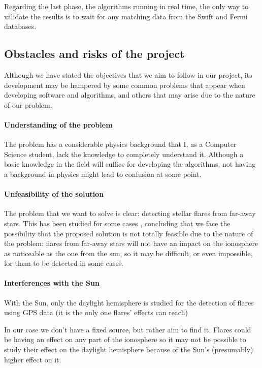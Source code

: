 Regarding the last phase, the algorithms running in real time, the only way to validate the results is to wait for any matching data from the Swift and Fermi databases.

\subsection{Obstacles and risks of the project}

Although we have stated the objectives that we aim to follow in our project, its development may be hampered by some common problems that appear when developing software and algorithms, and others that may arise due to the nature of our problem.

\paragraph{Understanding of the problem}

The problem has a considerable physics background that I, as a Computer Science student, lack the knowledge to completely understand it. Although a basic knowledge in the field will suffice for developing the algorithms, not having a background in physics might lead to confusion at some point.

\paragraph{Unfeasibility of the solution}

The problem that we want to solve is clear: detecting stellar flares from far-away stars. This has been studied for some cases \cite{martinez2016first}, concluding that we face the possibility that the proposed solution is not totally feasible due to the nature of the problem: flares from far-away stars will not have an impact on the ionosphere as noticeable as the one from the sun, so it may be difficult, or even impossible, for them to be detected in some cases.

\paragraph{Interferences with the Sun}

With the Sun, only the daylight hemisphere is studied for the detection of flares using GPS data (it is the only one flares' effects can reach)

In our case we don’t have a fixed source, but rather aim to find it. Flares could be having an effect on any part of the ionosphere so it may not be possible to study their effect on the daylight hemisphere because of the Sun’s (presumably) higher effect on it. 

